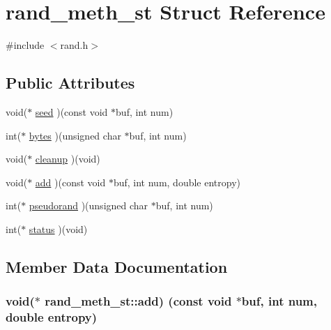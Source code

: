 \hypertarget{structrand__meth__st}{}\section{rand\+\_\+meth\+\_\+st Struct Reference}
\label{structrand__meth__st}


{\ttfamily \#include $<$rand.\+h$>$}

\subsection*{Public Attributes}
\begin{DoxyCompactItemize}
\item 
void($\ast$ \hyperlink{structrand__meth__st_ac5982cb0ac2304a601df7fb009624ec9}{seed} )(const void $\ast$buf, int num)
\item 
int($\ast$ \hyperlink{structrand__meth__st_a41a49e87fa960f2e4f46fec63044ad8d}{bytes} )(unsigned char $\ast$buf, int num)
\item 
void($\ast$ \hyperlink{structrand__meth__st_ab043138ccf85baf2d6f12ab1e5011dff}{cleanup} )(void)
\item 
void($\ast$ \hyperlink{structrand__meth__st_a5587c9d9c28a2abf0136fcc499028f5b}{add} )(const void $\ast$buf, int num, double entropy)
\item 
int($\ast$ \hyperlink{structrand__meth__st_a5e7b24146c610773f7eb0470e54b1408}{pseudorand} )(unsigned char $\ast$buf, int num)
\item 
int($\ast$ \hyperlink{structrand__meth__st_ab7591ea659457fcd115d7dc0a4e54125}{status} )(void)
\end{DoxyCompactItemize}


\subsection{Member Data Documentation}
\subsubsection[{\texorpdfstring{add}{add}}]{\setlength{\rightskip}{0pt plus 5cm}void($\ast$ rand\+\_\+meth\+\_\+st\+::add) (const void $\ast$buf, int num, double entropy)}\hypertarget{structrand__meth__st_a5587c9d9c28a2abf0136fcc499028f5b}{}\label{structrand__meth__st_a5587c9d9c28a2abf0136fcc499028f5b}
